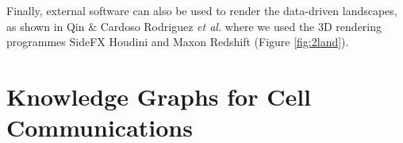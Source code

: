 Finally, external software can also be used to render the data-driven landscapes, as shown in Qin \& Cardoso Rodriguez \emph{et al.} where we used the 3D rendering programmes SideFX Houdini and Maxon Redshift (Figure \ref{fig:2land}).






\newpage
\section{Knowledge Graphs for Cell Communications}


